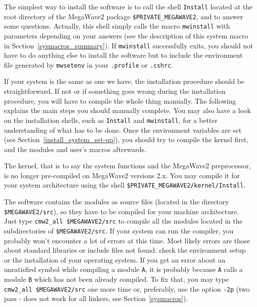 The simplest way to install the software is to call the shell \verb+Install+ located at the root directory
of the MegaWave2 package \verb+$PRIVATE_MEGAWAVE2+, and to answer some questions. 
Actually, this shell simply calls the macro \verb+mwinstall+ 
with parameters depending on your answers (see the description of this system macro in 
Section~\ref{sysmacros_summary}).
If \verb+mwinstall+ successfully exits, you should not have to do anything else to install the software
but to include the environment file generated by \verb+mwsetenv+ in your \verb+.profile+ or \verb+.cshrc+.

If your system is the same as one we have, the installation procedure should be straightforward.
If not or if something goes wrong during the installation procedure, you will have to compile the whole thing
manually. The following explains the main steps you should manually complete. You may also have a look on
the installation shells, such as \verb+Install+ and \verb+mwinstall+, for a better understanding of what has
to be done. Once the environment variables are set (see Section~\ref{install_system_set-up}), you should try to compile
the kernel first, and the modules and user's macros afterwards. 

The kernel, that is to say the system functions and the MegaWave2 preprocessor, is no longer pre-compiled on
MegaWave2 versions 2.x. You may compile it for your system architecture using the shell 
\verb+$PRIVATE_MEGAWAVE2/kernel/Install+.

The software contains the modules as source files (located in the directory \verb+$MEGAWAVE2/src+), so they have to be 
compiled for your machine architecture.
Just type \verb+cmw2_all $MEGAWAVE2/src+ to compile all the modules located in the subdirectories
of \verb+$MEGAWAVE2/src+.
If your system can run the compiler, you probably won't encounter a lot of errors at this time.
Most likely errors are those about standard libraries or include files not found: check the environment setup or the installation of your operating system.
If you get an error about an unsatisfied symbol while compiling a module \verb+A+, it is probably because \verb+A+ calls a module \verb+B+ which has not been already compiled. 
To fix that, you may type \verb+cmw2_all $MEGAWAVE2/src+ one more time or, preferably, 
use the option \verb+-2p+ (two pass - does not work for all linkers, see 
Section~\ref{sysmacros}).

